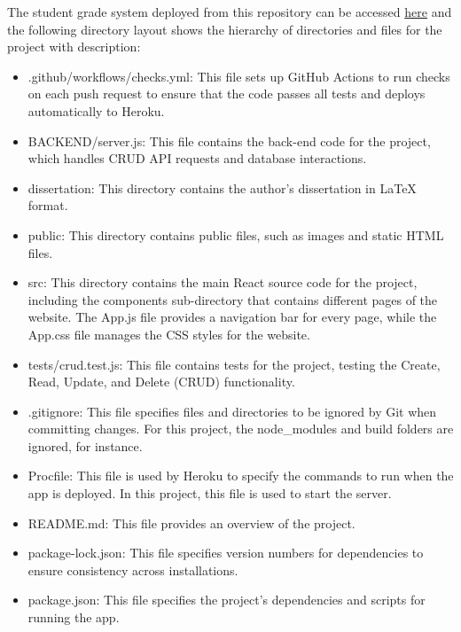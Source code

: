 The student grade system deployed from this repository can be accessed \href{https://student-grade-system.herokuapp.com/}{here} and the following directory layout shows the hierarchy of directories and files for the project with description:\newline


\begin{itemize}
\item .github/workflows/checks.yml: This file sets up GitHub Actions to run checks on each push request to ensure that the code passes all tests and deploys automatically to Heroku.
\item BACKEND/server.js: This file contains the back-end code for the project, which handles CRUD API requests and database interactions.
\item dissertation: This directory contains the author's dissertation in LaTeX format.
\item public: This directory contains public files, such as images and static HTML files.
\item src: This directory contains the main React source code for the project, including the components sub-directory that contains different pages of the website. The App.js file provides a navigation bar for every page, while the App.css file manages the CSS styles for the website.
\item tests/crud.test.js: This file contains tests for the project, testing the Create, Read, Update, and Delete (CRUD) functionality.
\item .gitignore: This file specifies files and directories to be ignored by Git when committing changes. For this project, the node\_modules and build folders are ignored, for instance.
\item Procfile: This file is used by Heroku to specify the commands to run when the app is deployed. In this project, this file is used to start the server.
\item README.md: This file provides an overview of the project.
\item package-lock.json: This file specifies version numbers for dependencies to ensure consistency across installations.
\item package.json: This file specifies the project's dependencies and scripts for running the app.
\end{itemize}